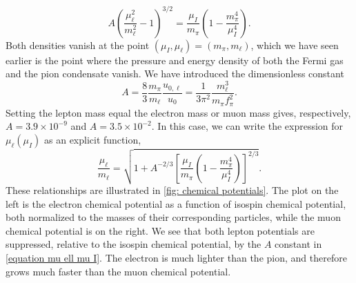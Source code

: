 %
\begin{equation}
    \label{equation mu ell mu I}
    A \left(\frac{\mu_\ell^2 }{m_\ell^2} - 1 \right)^{3/2}
    = \frac{\mu_I}{m_\pi}\left( 1 - \frac{m_\pi^4}{\mu_I^4}  \right).
\end{equation}
%
Both densities vanish at the point $(\mu_I, \mu_\ell) = (m_\pi, m_\ell)$, which we have seen earlier is the point where the pressure and energy density of both the Fermi gas and the pion condensate vanish.
We have introduced the dimensionless constant
%
\begin{equation}
    A = \frac{8}{3} \frac{m_\pi} {m_\ell} \frac{u_{0, \ell}}{u_0}
    = \frac{1}{3 \pi^2} \frac{m_\ell^3}{m_\pi f_\pi^2}.
\end{equation}
%
Setting the lepton mass equal the electron mass or muon mass gives, respectively, $A = 3.9 \times10^{- 9}$ and $A = 3.5 \times 10^{-2}$.
In this case, we can write the expression for $\mu_\ell(\mu_I)$ as an explicit function,
%
\begin{equation}
    \label{mu ell from mu I}
    \frac{\mu_\ell}{m_\ell}
    =
    \sqrt{
        1 + A^{-2/3}
        \left[
            \frac{\mu_I}{m_\pi}\left( 1 - \frac{m_\pi^4}{\mu_I^4}  \right)
        \right]^{2/3}
    }.
\end{equation}
%
These relationships are illustrated in \autoref{fig: chemical potentials}.
The plot on the left is the electron chemical potential as a function of isospin chemical potential, both normalized to the masses of their corresponding particles, while the muon chemical potential is on the right.
We see that both lepton potentials are suppressed, relative to the isospin chemical potential, by the $A$ constant in \autoref{equation mu ell mu I}.
The electron is much lighter than the pion, and therefore grows much faster than the muon chemical potential.

